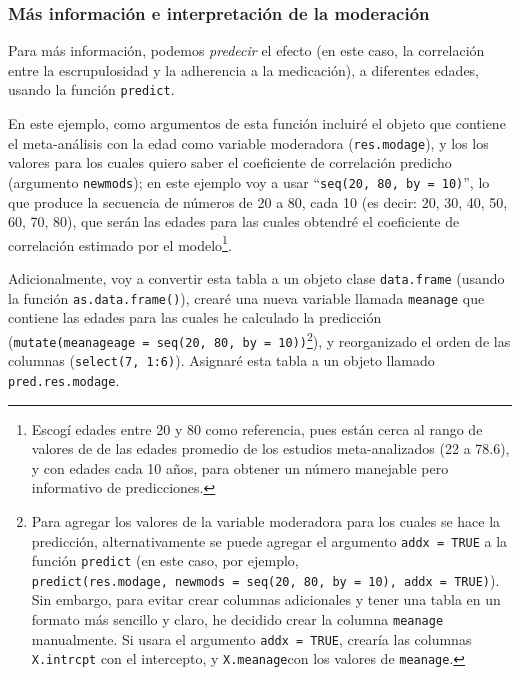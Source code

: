 \documentclass[
  bookmarksnumbered]{article}
\begin{document}
\hypertarget{pred-mods}{%
\subsubsection{Más información e interpretación de la moderación}\label{pred-mods}}

Para más información, podemos \emph{predecir} el efecto (en este caso, la correlación entre la escrupulosidad y la adherencia a la medicación), a diferentes edades, usando la función \texttt{predict}.

En este ejemplo, como argumentos de esta función incluiré el objeto que contiene el meta-análisis con la edad como variable moderadora (\texttt{res.modage}), y los los valores para los cuales quiero saber el coeficiente de correlación predicho (argumento \texttt{newmods}); en este ejemplo voy a usar ``\texttt{seq(20,\ 80,\ by\ =\ 10)}'', lo que produce la secuencia de números de 20 a 80, cada 10 (es decir: 20, 30, 40, 50, 60, 70, 80), que serán las edades para las cuales obtendré el coeficiente de correlación estimado por el modelo\footnote{Escogí edades entre 20 y 80 como referencia, pues están cerca al rango de valores de de las edades promedio de los estudios meta-analizados (22 a 78.6), y con edades cada 10 años, para obtener un número manejable pero informativo de predicciones.}.

Adicionalmente, voy a convertir esta tabla a un objeto clase \texttt{data.frame} (usando la función \texttt{as.data.frame()}), crearé una nueva variable llamada \texttt{meanage} que contiene las edades para las cuales he calculado la predicción (\texttt{mutate(meanageage\ =\ seq(20,\ 80,\ by\ =\ 10))}\footnote{Para agregar los valores de la variable moderadora para los cuales se hace la predicción, alternativamente se puede agregar el argumento \texttt{addx\ =\ TRUE} a la función \texttt{predict} (en este caso, por ejemplo, \texttt{predict(res.modage,\ newmods\ =\ seq(20,\ 80,\ by\ =\ 10),\ addx\ =\ TRUE)}). Sin embargo, para evitar crear columnas adicionales y tener una tabla en un formato más sencillo y claro, he decidido crear la columna \texttt{meanage} manualmente. Si usara el argumento \texttt{addx\ =\ TRUE}, crearía las columnas \texttt{X.intrcpt} con el intercepto, y \texttt{X.meanage}con los valores de \texttt{meanage}.}), y reorganizado el orden de las columnas (\texttt{select(7,\ 1:6)}). Asignaré esta tabla a un objeto llamado \texttt{pred.res.modage}.
\end{document}
